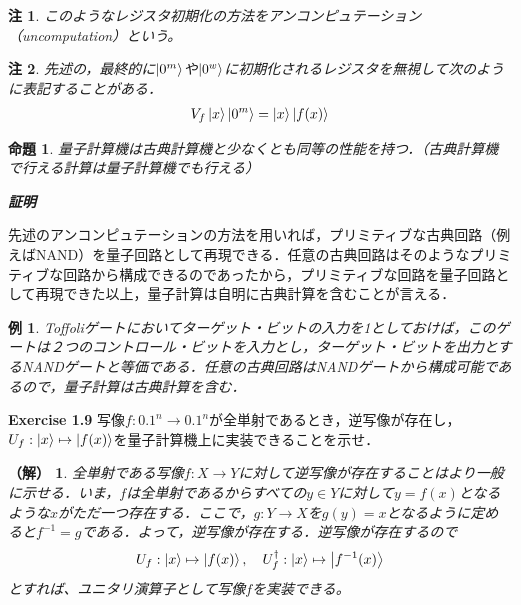 \documentclass[dvipdfmx]{jarticle}
\makeatletter
\numberwithin{equation}{section}
\renewenvironment{proof}[1][\proofname]{\par
  \pushQED{\qed}
  \normalfont \topsep6\p@\@plus6\p@\relax
  \trivlist
  \item\relax
  {\itshape
  #1\@addpunct{ }}\hspace\labelsep\ignorespaces
}{
  \popQED\endtrivlist\@endpefalse
}
\theoremstyle{seminar}
\newtheorem{proposition}{命題}[section]
\newtheorem{example}{例}[section]
\newtheorem{remark}{注}[section]
\newtheorem*{solution}{（解）}
\renewcommand{\proofname}{\textbf{証明}}
\makeatother
\begin{document}
\begin{remark}
  このようなレジスタ初期化の方法をアンコンピュテーション（uncomputation）という。
\end{remark}
\begin{remark}
  先述の，最終的に$\ket{0^m}$や$\ket{0^w}$に初期化されるレジスタを無視して次のように表記することがある．
  \begin{align}
    V_f \ket{x}\ket{0^m} = \ket{x}\ket{f(x)}
  \end{align}
\end{remark}
\begin{proposition}
  量子計算機は古典計算機と少なくとも同等の性能を持つ．（古典計算機で行える計算は量子計算機でも行える）
\end{proposition}

\begin{proof}
  先述のアンコンピュテーションの方法を用いれば，プリミティブな古典回路（例えばNAND）を量子回路として再現できる．任意の古典回路はそのようなプリミティブな回路から構成できるのであったから，プリミティブな回路を量子回路として再現できた以上，量子計算は自明に古典計算を含むことが言える．
\end{proof}

\begin{example}
  Toffoliゲートにおいてターゲット・ビットの入力を1としておけば，このゲートは２つのコントロール・ビットを入力とし，ターゲット・ビットを出力とするNANDゲートと等価である．任意の古典回路はNANDゲートから構成可能であるので，量子計算は古典計算を含む．
\end{example}

\begin{gray}
  {\bf Exercise 1.9} \hspace{1em} 写像$f: \qty{0, 1}^n \rightarrow \qty{0, 1}^n$が全単射であるとき，逆写像が存在し，$U_f: \ket{x} \mapsto \ket{f(x)}$を量子計算機上に実装できることを示せ．
\end{gray}

\begin{solution}
  全単射である写像$f: X \rightarrow Y$に対して逆写像が存在することはより一般に示せる．いま，$f$は全単射であるからすべての$y \in Y$に対して$y = f(x)$となるような$x$がただ一つ存在する．ここで，$g: Y \rightarrow X$を$g(y) = x$となるように定めると$f^{-1} = g$である．よって，逆写像が存在する．逆写像が存在するので
  \begin{align}
    U_f: \ket{x} \mapsto \ket{f(x)}, \quad  U^\dagger_f : \ket{x} \mapsto \ket{f^{-1}(x)}
  \end{align}
  とすれば、ユニタリ演算子として写像$f$を実装できる。
\end{solution}
\end{document}
